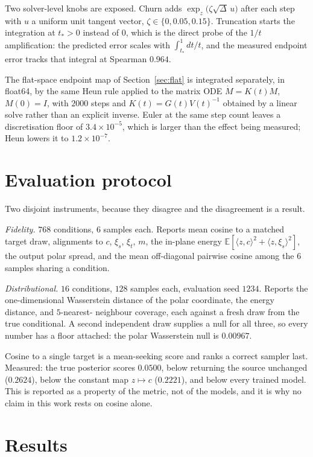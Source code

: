 \documentclass[11pt]{article}
\newcommand{\E}{\mathbb{E}}
\begin{document}
Two solver-level knobs are exposed. Churn adds $\exp_z\!\big(\zeta\sqrt{\Delta}\,u\big)$ after each
step with $u$ a uniform unit tangent vector, $\zeta\in\{0,0.05,0.15\}$. Truncation starts the
integration at $t_\ast>0$ instead of $0$, which is the direct probe of the $1/t$ amplification:
the predicted error scales with $\int_{t_\ast}^{1}dt/t$, and the measured endpoint error tracks
that integral at Spearman $0.964$.

The flat-space endpoint map of Section~\ref{sec:flat} is integrated separately, in float64, by the
same Heun rule applied to the matrix ODE $\dot M=K(t)M$, $M(0)=I$, with $2000$ steps and
$K(t)=G(t)V(t)^{-1}$ obtained by a linear solve rather than an explicit inverse. Euler at the same
step count leaves a discretisation floor of $3.4\times10^{-5}$, which is larger than the effect
being measured; Heun lowers it to $1.2\times10^{-7}$.

\section{Evaluation protocol}
\label{sec:proto}

Two disjoint instruments, because they disagree and the disagreement is a result.

\emph{Fidelity.} $768$ conditions, $6$ samples each. Reports mean cosine to a matched target draw,
alignments to $c$, $\xi_s$, $\xi_t$, $m$, the in-plane energy
$\E[\langle z,c\rangle^2+\langle z,\xi_s\rangle^2]$, the output polar spread, and the mean
off-diagonal pairwise cosine among the $6$ samples sharing a condition.

\emph{Distributional.} $16$ conditions, $128$ samples each, evaluation seed $1234$. Reports the
one-dimensional Wasserstein distance of the polar coordinate, the energy distance, and $5$-nearest-
neighbour coverage, each against a fresh draw from the true conditional. A second independent
draw supplies a null for all three, so every number has a floor attached: the polar Wasserstein
null is $0.00967$.

Cosine to a single target is a mean-seeking score and ranks a correct sampler last. Measured: the
true posterior scores $0.0500$, below returning the source unchanged ($0.2624$), below the constant
map $z\mapsto c$ ($0.2221$), and below every trained model. This is reported as a property of the
metric, not of the models, and it is why no claim in this work rests on cosine alone.

\section{Results}
\label{sec:results}
\end{document}
